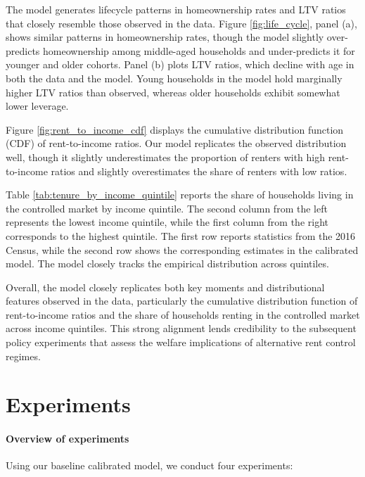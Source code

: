 \documentclass[parskip=full]{article}
\begin{document}
The model generates lifecycle patterns in homeownership rates and LTV ratios that closely resemble those observed in the data. Figure \ref{fig:life_cycle}, panel (a), shows similar patterns in homeownership rates, though the model slightly over-predicts homeownership among middle-aged households and under-predicts it for younger and older cohorts. Panel (b) plots LTV ratios, which decline with age in both the data and the model. Young households in the model hold marginally higher LTV ratios than observed, whereas older households exhibit somewhat lower leverage.

Figure \ref{fig:rent_to_income_cdf} displays the cumulative distribution function (CDF) of rent-to-income ratios. Our model replicates the observed distribution well, though it slightly underestimates the proportion of renters with high rent-to-income ratios and slightly overestimates the share of renters with low ratios.

Table \ref{tab:tenure_by_income_quintile} reports the share of households living in the controlled market by income quintile. The second column from the left represents the lowest income quintile, while the first column from the right corresponds to the highest quintile. The first row reports statistics from the 2016 Census, while the second row shows the corresponding estimates in the calibrated model. The model closely tracks the empirical distribution across quintiles.

Overall, the model closely replicates both key moments and distributional features observed in the data, particularly the cumulative distribution function of rent-to-income ratios and the share of households renting in the controlled market across income quintiles. This strong alignment lends credibility to the subsequent policy experiments that assess the welfare implications of alternative rent control regimes.

\section{Experiments}\label{section:experiments}

\paragraph{Overview of experiments} Using our baseline calibrated model, we conduct four experiments:
\end{document}

